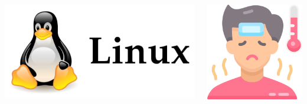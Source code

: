\documentclass{beamer}
\begin{document}
\begin{CJK*}{UTF8}{bsmi}
\begin{frame}
\begin{columns}
\begin{column}{0.30\textwidth}
\begin{tikzpicture}
                \end{tikzpicture}
                \includegraphics[width=\textwidth]{linux.png}
            \end{column}
            \begin{column}{0.30\textwidth}
                \centering
                \includegraphics[height=0.3\textheight]{sick.png}\\

\end{column}
\end{columns}
\end{frame}
\end{CJK*}
\end{document}
